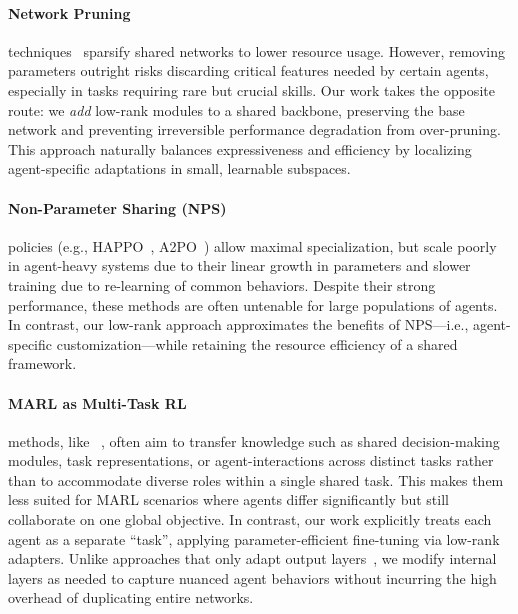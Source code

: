 \paragraph{Network Pruning} techniques~\citep{PSNetworkPruning} sparsify shared networks to lower resource usage. However, removing parameters outright risks discarding critical features needed by certain agents, especially in tasks requiring rare but crucial skills. Our work takes the opposite route: we \emph{add} low-rank modules to a shared backbone, preserving the base network and preventing irreversible performance degradation from over-pruning. This approach naturally balances expressiveness and efficiency by localizing agent-specific adaptations in small, learnable subspaces.

\paragraph{Non-Parameter Sharing (NPS)} policies (e.g., HAPPO~\citep{HAPPO}, A2PO~\citep{A2PO}) allow maximal specialization, but scale poorly in agent-heavy systems due to their linear growth in parameters and slower training due to re-learning of common behaviors. Despite their strong performance, these methods are often untenable for large populations of agents. In contrast, our low-rank approach approximates the benefits of NPS—i.e., agent-specific customization—while retaining the resource efficiency of a shared framework.

\paragraph{MARL as Multi-Task RL} methods, like ~\citep{wang2023multitaskmultiagentsharedlayers, omidshafiei2017deepdecentralizedmultitaskmultiagent, MultiTaskMARL, zhang2024hybridtrainingenhancedmultitask, PrioritizedTasKMining}, often aim to transfer knowledge such as shared decision-making modules, task representations, or agent-interactions across distinct tasks rather than to accommodate diverse roles within a single shared task. This makes them less suited for MARL scenarios where agents differ significantly but still collaborate on one global objective. In contrast, our work explicitly treats each agent as a separate “task”, applying parameter-efficient fine-tuning via low-rank adapters. Unlike approaches that only adapt output layers~\citep{MTL}, we modify internal layers as needed to capture nuanced agent behaviors without incurring the high overhead of duplicating entire networks.